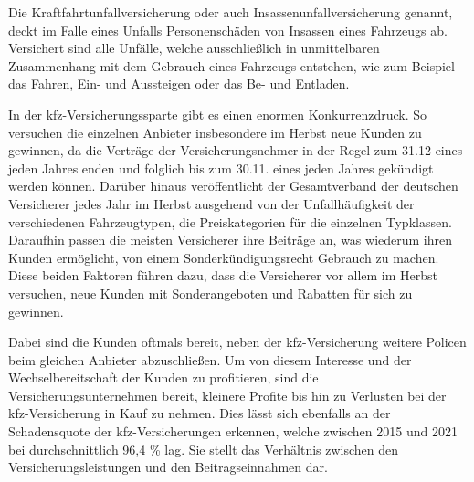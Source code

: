 Die Kraftfahrtunfallversicherung oder auch Insassenunfallversicherung genannt, deckt im Falle eines Unfalls Personenschäden von Insassen eines Fahrzeugs ab. Versichert sind alle Unfälle, welche ausschließlich in unmittelbaren Zusammenhang mit dem Gebrauch eines Fahrzeugs entstehen, wie zum Beispiel das Fahren, Ein- und Aussteigen oder das Be- und Entladen.\autocite[Vgl.][S. 6f]{STADLER1998} 


In der \ac{kfz}-Versicherungssparte gibt es einen enormen Konkurrenzdruck. So versuchen die einzelnen Anbieter insbesondere im Herbst neue Kunden zu gewinnen, da die Verträge der Versicherungsnehmer in der Regel zum 31.12 eines jeden Jahres enden und folglich bis zum 30.11. eines jeden Jahres gekündigt werden können.\autocite[Vgl.][]{WARENTEST2022} Darüber hinaus veröffentlicht der Gesamtverband der deutschen Versicherer jedes Jahr im Herbst ausgehend von der Unfallhäufigkeit der verschiedenen Fahrzeugtypen, die Preiskategorien für die einzelnen Typklassen. Daraufhin passen die meisten Versicherer ihre Beiträge an, was wiederum ihren Kunden ermöglicht, von einem Sonderkündigungsrecht Gebrauch zu machen.\autocite[Vgl.][]{NUS2022} Diese beiden Faktoren führen dazu, dass die Versicherer vor allem im Herbst versuchen, neue Kunden mit Sonderangeboten und Rabatten für sich zu gewinnen. 


Dabei sind die Kunden oftmals bereit, neben der \ac{kfz}-Versicherung weitere Policen beim gleichen Anbieter abzuschließen. Um von diesem Interesse und der Wechselbereitschaft der Kunden zu profitieren, sind die Versicherungsunternehmen bereit, kleinere Profite bis hin zu Verlusten bei der \ac{kfz}-Versicherung in Kauf zu nehmen.\autocite[Vgl.][]{HARTUNG2019} Dies lässt sich ebenfalls an der Schadensquote der \ac{kfz}-Versicherungen erkennen, welche zwischen 2015 und 2021 bei durchschnittlich 96,4 \% lag. Sie stellt das Verhältnis zwischen den Versicherungsleistungen und den Beitragseinnahmen dar.\autocite[Vgl.][]{GDVKFZ}  




\newpage
